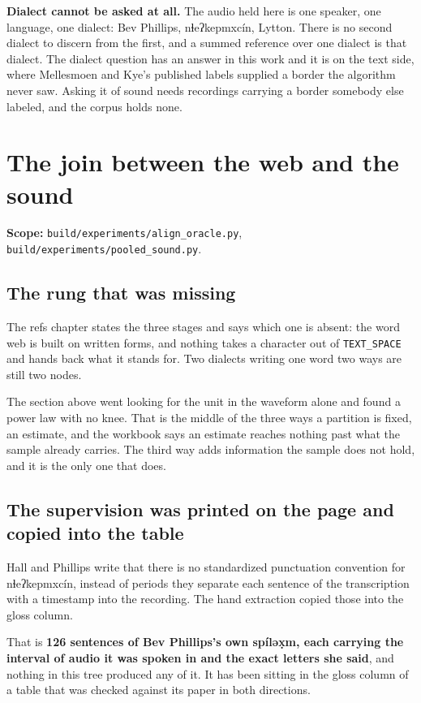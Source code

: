 \textbf{Dialect cannot be asked at all.} The audio held here is one speaker, one language, one
dialect: Bev Phillips, nɬeʔkepmxcín, Lytton. There is no second dialect to discern from the first, and
a summed reference over one dialect is that dialect. The dialect question has an answer in this work
and it is on the text side, where Mellesmoen and Kye's published labels supplied a border the
algorithm never saw. Asking it of sound needs recordings carrying a border somebody else labeled, and
the corpus holds none.

\section{The join between the web and the sound}

\textbf{Scope:} \texttt{build/\allowbreak{}experiments/\allowbreak{}align\_\allowbreak{}oracle.\allowbreak{}py},
\texttt{build/\allowbreak{}experiments/\allowbreak{}pooled\_\allowbreak{}sound.\allowbreak{}py}.

\subsection{The rung that was missing}

The refs chapter states the three stages and says which one is absent: the word web is built on written
forms, and nothing takes a character out of \texttt{TEXT\_\allowbreak{}SPACE} and hands back what it
stands for. Two dialects writing one word two ways are still two nodes.

The section above went looking for the unit in the waveform alone and found a power law with no knee.
That is the middle of the three ways a partition is fixed, an estimate, and the workbook says an
estimate reaches nothing past what the sample already carries. The third way adds information the
sample does not hold, and it is the only one that does.

\subsection{The supervision was printed on the page and copied into the table}

Hall and Phillips write that there is no standardized punctuation convention for nɬeʔkepmxcín,
instead of periods they separate each sentence of the transcription with a timestamp into the
recording. The hand extraction copied those into the gloss column.

That is \textbf{126 sentences of Bev Phillips's own spíləx̣m, each carrying the interval of audio it
was spoken in and the exact letters she said}, and nothing in this tree produced any of it. It has
been sitting in the gloss column of a table that was checked against its paper in both directions.

